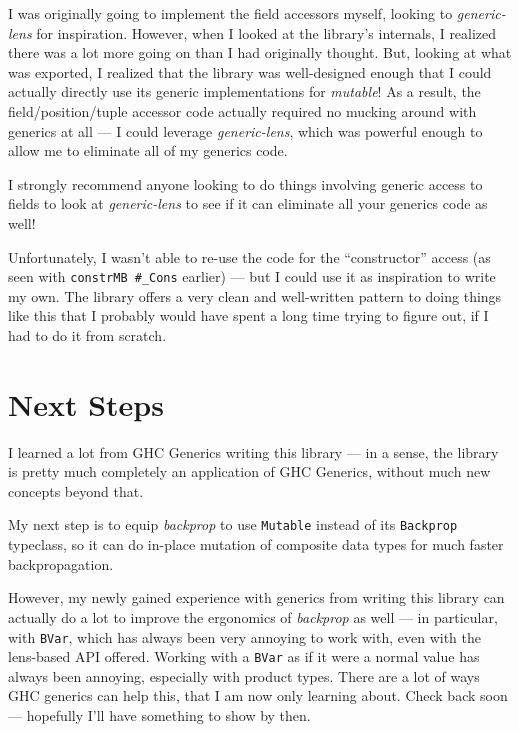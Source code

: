 \documentclass[]{article}
\begin{document}
I was originally going to implement the field accessors myself, looking to
\emph{generic-lens} for inspiration. However, when I looked at the library's
internals, I realized there was a lot more going on than I had originally
thought. But, looking at what was exported, I realized that the library was
well-designed enough that I could actually directly use its generic
implementations for \emph{mutable}! As a result, the field/position/tuple
accessor code actually required no mucking around with generics at all --- I
could leverage \emph{generic-lens}, which was powerful enough to allow me to
eliminate all of my generics code.

I strongly recommend anyone looking to do things involving generic access to
fields to look at \emph{generic-lens} to see if it can eliminate all your
generics code as well!

Unfortunately, I wasn't able to re-use the code for the ``constructor'' access
(as seen with \texttt{constrMB\ \#\_Cons} earlier) --- but I could use it as
inspiration to write my own. The library offers a very clean and well-written
pattern to doing things like this that I probably would have spent a long time
trying to figure out, if I had to do it from scratch.

\hypertarget{next-steps}{%
\section{Next Steps}\label{next-steps}}

I learned a lot from GHC Generics writing this library --- in a sense, the
library is pretty much completely an application of GHC Generics, without much
new concepts beyond that.

My next step is to equip \emph{backprop} to use \texttt{Mutable} instead of its
\texttt{Backprop} typeclass, so it can do in-place mutation of composite data
types for much faster backpropagation.

However, my newly gained experience with generics from writing this library can
actually do a lot to improve the ergonomics of \emph{backprop} as well --- in
particular, with \texttt{BVar}, which has always been very annoying to work
with, even with the lens-based API offered. Working with a \texttt{BVar} as if
it were a normal value has always been annoying, especially with product types.
There are a lot of ways GHC generics can help this, that I am now only learning
about. Check back soon --- hopefully I'll have something to show by then.
\end{document}
